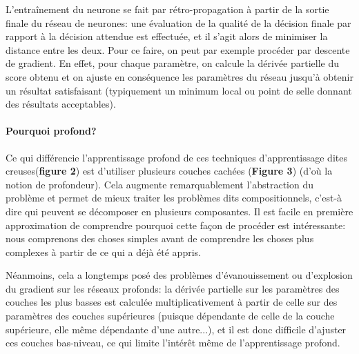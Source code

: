 \documentclass[a4paper, 11pt, onecolumn]{article}
\begin{document}
L'entraînement du neurone se fait par rétro-propagation à partir de la sortie
finale du réseau de neurones: une évaluation de la qualité de la décision finale
par rapport à la décision attendue est effectuée, et il
s'agit alors de minimiser la distance entre les deux. Pour ce
faire, on peut par exemple procéder par descente de gradient. En effet, pour
chaque paramètre, on calcule la dérivée partielle du score obtenu et on ajuste en
conséquence les paramètres du réseau jusqu'à obtenir un résultat satisfaisant
(typiquement un minimum local ou point de selle donnant des résultats acceptables).

\paragraph{Pourquoi profond?}

Ce qui différencie l'apprentissage profond de ces techniques d'apprentissage dites \og
creuses\fg (\textbf{figure 2}) est d'utiliser plusieurs couches cachées
(\textbf{Figure 3}) (d'où la notion de
profondeur). Cela augmente remarquablement l'abstraction du problème et permet
de mieux traiter les problèmes dits compositionnels, c'est-à dire qui peuvent se
décomposer en plusieurs composantes. Il est facile en première approximation de
comprendre pourquoi cette façon de procéder est intéressante: nous comprenons
des choses simples avant de comprendre les choses plus complexes à partir de ce
qui a déjà été appris.

Néanmoins, cela a longtemps posé des problèmes d'évanouissement ou d'explosion du gradient sur les
réseaux profonds: la dérivée partielle sur les paramètres des couches les plus
basses est calculée multiplicativement à partir de celle sur des paramètres des
couches supérieures (puisque dépendante de celle de la couche
supérieure, elle même dépendante d'une autre...), et il est donc difficile d'ajuster ces couches
bas-niveau, ce qui limite l'intérêt même de l'apprentissage profond.
\end{document}
